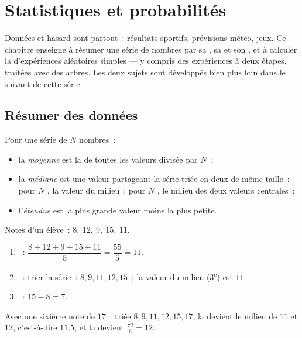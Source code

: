 \chapter{Statistiques et probabilités}\label{ch:g9:statproba}

Données et hasard sont partout~: résultats sportifs, prévisions météo,
jeux. Ce chapitre enseigne à résumer une série de nombres par sa
, sa  et son , et à calculer la 
d'expériences aléatoires simples --- y compris des expériences à deux
étapes, traitées avec des arbres. Les deux sujets sont développés bien
plus loin dans le  suivant de cette série.

\section{Résumer des données}

\begin{definition}\label{def:g9:statproba:indicators}
Pour une série de $N$ nombres~:
\begin{itemize}
  \item la \emph{moyenne} est la  de toutes les
        valeurs divisée par $N$~;
  \item la \emph{médiane} est une valeur partageant la
        série triée en deux  de même taille~: pour $N$ , la
        valeur du milieu~; pour $N$ , le milieu des deux valeurs
        centrales~;
  \item l'\emph{étendue} est la plus grande valeur moins
        la plus petite.
\end{itemize}
\end{definition}

\begin{example}\label{ex:g9:statproba:indicators}
Notes d'un élève~: $8,\ 12,\ 9,\ 15,\ 11$.
\begin{enumerate}
  \item {}~: $\dfrac{8 + 12 + 9 + 15 + 11}{5} = \dfrac{55}{5} = 11$.
  \item {}~: trier la série~: $8, 9, 11, 12, 15$~; la valeur du
        milieu (3\textsuperscript{e}) est $11$.
  \item {}~: $15 - 8 = 7$.
\end{enumerate}
Avec une sixième note de $17$~: triée $8, 9, 11, 12, 15, 17$, la 
devient le milieu de $11$ et $12$, c'est-à-dire $11.5$, et la 
devient $\frac{72}{6} = 12$.
\end{example}

